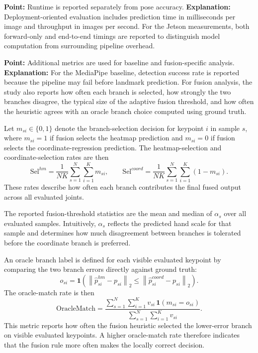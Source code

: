 \documentclass[10pt,letterpaper]{article}
\begin{document}
\medskip
\noindent\textbf{Point:} Runtime is reported separately from pose accuracy.  
\textbf{Explanation:} Deployment-oriented evaluation includes prediction time in milliseconds per image and throughput in images per second. For the Jetson measurements, both forward-only and end-to-end timings are reported to distinguish model computation from surrounding pipeline overhead.

\medskip
\noindent\textbf{Point:} Additional metrics are used for baseline and fusion-specific analysis.  
\textbf{Explanation:} For the MediaPipe baseline, detection success rate is reported because the pipeline may fail before landmark prediction. For fusion analysis, the study also reports how often each branch is selected, how strongly the two branches disagree, the typical size of the adaptive fusion threshold, and how often the heuristic agrees with an oracle branch choice computed using ground truth.

Let \(m_{si} \in \{0,1\}\) denote the branch-selection decision for keypoint \(i\) in sample \(s\), where \(m_{si}=1\) if fusion selects the heatmap prediction and \(m_{si}=0\) if fusion selects the coordinate-regression prediction. The heatmap-selection and coordinate-selection rates are then
\begin{equation}
\mathrm{Sel}^{hm} =
\frac{1}{NK}
\sum_{s=1}^{N}\sum_{i=1}^{K} m_{si},
\qquad
\mathrm{Sel}^{coord} =
\frac{1}{NK}
\sum_{s=1}^{N}\sum_{i=1}^{K} (1-m_{si}).
\label{eq:selection-rates}
\end{equation}
These rates describe how often each branch contributes the final fused output across all evaluated joints.

The reported fusion-threshold statistics are the mean and median of \(\alpha_s\) over all evaluated samples. Intuitively, \(\alpha_s\) reflects the predicted hand scale for that sample and determines how much disagreement between branches is tolerated before the coordinate branch is preferred.

An oracle branch label is defined for each visible evaluated keypoint by comparing the two branch errors directly against ground truth:
\begin{equation}
o_{si} =
\mathbf{1}
\left(
\left\|
\hat{p}^{hm}_{si} - p_{si}
\right\|_2
\le
\left\|
\hat{p}^{coord}_{si} - p_{si}
\right\|_2
\right).
\label{eq:oracle-label}
\end{equation}
The oracle-match rate is then
\begin{equation}
\mathrm{OracleMatch} =
\frac{
\sum_{s=1}^{N}\sum_{i=1}^{K}
v_{si}\,\mathbf{1}(m_{si}=o_{si})
}{
\sum_{s=1}^{N}\sum_{i=1}^{K} v_{si}
}.
\label{eq:oracle-match}
\end{equation}
This metric reports how often the fusion heuristic selected the lower-error branch on visible evaluated keypoints. A higher oracle-match rate therefore indicates that the fusion rule more often makes the locally correct decision.
\end{document}
